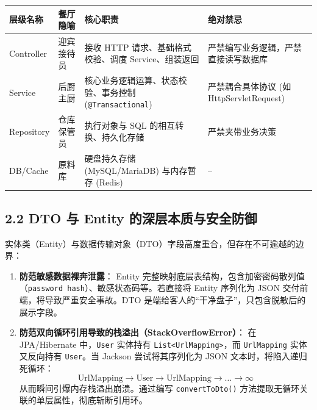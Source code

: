 \documentclass[11pt,a4paper]{ctexart}
\begin{document}
\begin{table}[htbp]
\centering
\begin{tabularx}{\textwidth}{@{}l l X X@{}}
\toprule
\textbf{层级名称} & \textbf{餐厅隐喻} & \textbf{核心职责} & \textbf{绝对禁忌} \\ \midrule
Controller & 迎宾接待员 & 接收 HTTP 请求、基础格式校验、调度 Service、组装返回 & 严禁编写业务逻辑，严禁直接读写数据库 \\
Service & 后厨主厨 & 核心业务逻辑运算、状态校验、事务控制 (\texttt{@Transactional}) & 严禁耦合具体协议 (如 HttpServletRequest) \\
Repository & 仓库保管员 & 执行对象与 SQL 的相互转换、持久化存储 & 严禁夹带业务决策 \\
DB/Cache & 原料库 & 硬盘持久存储 (MySQL/MariaDB) 与内存暂存 (Redis) & -- \\ \bottomrule
\end{tabularx}
\end{table}

\subsection{2.2 DTO 与 Entity 的深层本质与安全防御}
实体类（Entity）与数据传输对象（DTO）字段高度重合，但存在不可逾越的边界：
\begin{enumerate}
    \item \textbf{防范敏感数据裸奔泄露}：
    Entity 完整映射底层表结构，包含加密密码散列值（\texttt{password hash}）、敏感状态码等。若直接将 Entity 序列化为 JSON 交付前端，将导致严重安全事故。DTO 是端给客人的“干净盘子”，只包含脱敏后的展示字段。
    \item \textbf{防范双向循环引用导致的栈溢出（StackOverflowError）}：
    在 JPA/Hibernate 中，\texttt{User} 实体持有 \texttt{List<UrlMapping>}，而 \texttt{UrlMapping} 实体又反向持有 \texttt{User}。当 Jackson 尝试将其序列化为 JSON 文本时，将陷入递归死循环：
    \[
    \text{UrlMapping} \longrightarrow \text{User} \longrightarrow \text{UrlMapping} \longrightarrow \dots \longrightarrow \infty
    \]
    从而瞬间引爆内存栈溢出崩溃。通过编写 \texttt{convertToDto()} 方法提取无循环关联的单层属性，彻底斩断引用环。
\end{enumerate}
\end{document}
